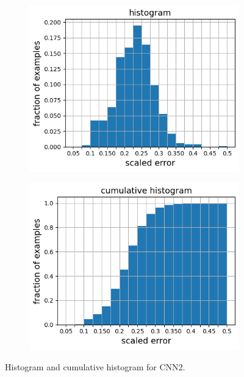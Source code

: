 \documentclass[10pt]{article}
\newcommand{\nhghalfwidth}{0.48\linewidth}
\newcommand{\nhgtotalheight}{4cm}
\begin{document}
\begin{figure}[!h]
\captionsetup[subfigure]{justification=centering}
  \centering
  \begin{subfigure}[c]{\nhghalfwidth}
    \centering
    \includegraphics[totalheight=\nhgtotalheight]{Figures/Results2/histogram.png}
  \end{subfigure}
%  
  \begin{subfigure}[c]{\nhghalfwidth}
    \centering
    \includegraphics[totalheight=\nhgtotalheight]{Figures/Results2/cumulative.png}
  \end{subfigure}
  \caption{\label{fig:cnn2histo} Histogram and cumulative histogram for CNN2.}
\end{figure}
%
\end{document}
